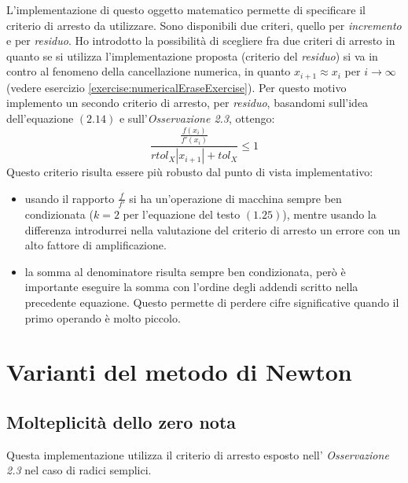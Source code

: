 L'implementazione di questo oggetto matematico permette di specificare il
criterio di arresto da utilizzare. Sono disponibili due criteri, quello per
\emph{incremento} e per \emph{residuo}. Ho introdotto la possibilit\`a di
scegliere fra due criteri di arresto in quanto se si utilizza l'implementazione
proposta (criterio del \emph{residuo}) si va in contro al fenomeno della
cancellazione numerica, in quanto $x_{i+1} \approx x_{i}$ per $i \rightarrow
\infty$ (vedere esercizio \ref{exercise:numericalEraseExercise}). Per questo
motivo implemento un secondo criterio di arresto, per \emph{residuo}, basandomi
sull'idea dell'equazione $(2.14)$ e sull'\emph{Osservazione 2.3}, ottengo:
\begin{displaymath}
\frac{\frac{f(x_{i})}{f'(x_{i})}}{rtol_{X}|x_{i + 1}| + tol_{X}} \leq 1
\end{displaymath}
Questo criterio risulta essere pi\`u robusto dal punto di vista implementativo:
\begin{itemize}
  \item usando il rapporto $\frac{f}{f'}$ si ha un'operazione di macchina sempre
  ben condizionata ($k = 2$ per l'equazione del testo $(1.25)$), mentre usando
  la differenza introdurrei nella valutazione del criterio di arresto un errore
  con un alto fattore di amplificazione.
  \item la somma al denominatore risulta sempre ben condizionata, per\`o \`e
  importante eseguire la somma con l'ordine degli addendi scritto nella
  precedente equazione. Questo permette di perdere cifre significative quando il
  primo operando \`e molto piccolo.
\end{itemize}


\section{Varianti del metodo di Newton}

\subsection{Molteplicit\`a dello zero nota}
\label{subsec:newtonMethodMultKnown}
Questa implementazione utilizza il criterio di arresto esposto nell'
\emph{Osservazione 2.3} nel caso di radici semplici.


